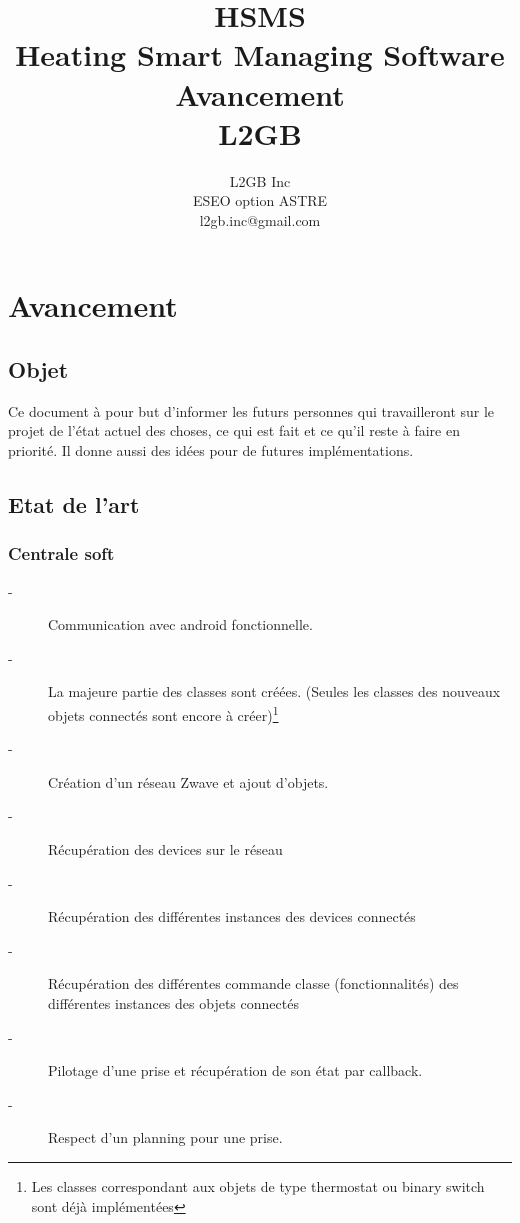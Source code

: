 \documentclass[11pt,a4paper]{report} %
\author{L2GB Inc\\
		ESEO option ASTRE\\
		l2gb.inc@gmail.com
		}
\title{HSMS\\Heating Smart Managing Software  \\Avancement\\L2GB}
\newcommand{\sommaire}{\shorttoc{Sommaire}{1}}
\renewcommand{\figurename}{Illustration} %
\begin{document}
\renewcommand{\figurename}{Illustration} 
\maketitle %
\sommaire %

\chapter{Avancement}
		\section{Objet}

Ce document à pour but d'informer les futurs personnes qui travailleront sur le projet de l'état actuel des choses, ce qui est fait et ce qu'il reste à faire en priorité. Il donne aussi des idées pour de futures implémentations.
\newpage

		\section{Etat de l'art}
		
			\subsection{Centrale soft}
			
\begin{description}
	\item[-] Communication avec android fonctionnelle.
	\item[-] La majeure partie des classes sont créées. (Seules les classes des nouveaux objets connectés sont encore à créer)\footnote{Les classes correspondant aux objets de type thermostat ou binary switch sont déjà implémentées}
	\item[-] Création d'un réseau Zwave et ajout d'objets.
	\item[-] Récupération des devices sur le réseau
	\item[-] Récupération des différentes instances des devices connectés
	\item[-] Récupération des différentes commande classe (fonctionnalités) des différentes instances des objets connectés
	\item[-] Pilotage d'une prise et récupération de son état par callback.
	\item[-] Respect d'un planning pour une prise.
\end{description}
\end{document}
